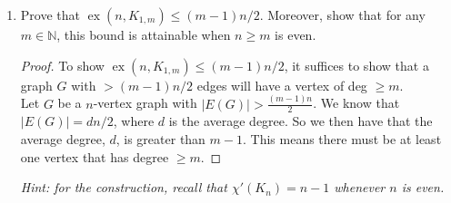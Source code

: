 \documentclass[12pt]{article}
\begin{document}
\begin{enumerate}
\begin{proof}
	To show that $\operatorname{ex}(n,P_n) \geq {n-1 \choose 2}$, we can make a $K_{n-1}$ graph and add a vertex with no edges. This $n$-vertex graph has ${n-1 \choose 2}$ edges and no $P_n$ as a subgraph.\\
	Showing $\operatorname{ex}(n,P_n) \leq {n-1 \choose 2}$. BWOC, let $G$ be a graph on $n$ vertices with $|E(G)| \geq {n-1 \choose 2}+1$. Let us then add an edge (ignoring the case when we can't since that would make the graph complete and trivial), we'll call $e$. So we now have $|E(G)| > {n-1 \choose 2}+1$. Since we know $\operatorname{ex}(n,C_n) = {n-1 \choose 2}+1$, $G$ must have a Hamiltonian cycle we'll call $C$. Let us now remove $e$ from $G$. We now have $\geq {n-1 \choose 2}+1$ edges.\\
	\textbf{Case 1:} $e\in C$. Then we have turned $C$ into a path that hits all the vertices, which is a $P_n$ path.\\
	\textbf{Case 2:} $e\nin C$. Then we still have a Hamiltonian path, which means we also have a $P_n$ as a subgraph.\\
	So for any graph with $\geq {n-1 \choose 2}+1$ edges, we will have a $P_n$ subgraph $\implies \operatorname{ex}(n,P_n) \leq {n-1 \choose 2}$.
\end{proof}
\medskip 

\item Prove that $\operatorname{ex}(n, K_{1,m}) \leq (m-1)n/2$. Moreover, show that for any $m \in \mathbb N$, this bound is attainable when $n\geq m$ is even.

\begin{proof}
	To show $\operatorname{ex}(n, K_{1,m}) \leq (m-1)n/2$, it suffices to show that a graph $G$ with $>(m-1)n/2$ edges will have a vertex of deg $\geq m$.\\
	Let $G$ be a $n$-vertex graph with $|E(G)|>\frac{(m-1)n}{2}$. We know that $|E(G)| = dn/2$, where $d$ is the average degree. So we then have that the average degree, $d$, is greater than $m-1$. This means there must be at least one vertex that has degree $\geq m$.
\end{proof}

\medskip

{\em Hint: for the construction, recall that $\chi'(K_n) = n-1$ whenever $n$ is even.}

\medskip


\end{enumerate}
\end{document}
